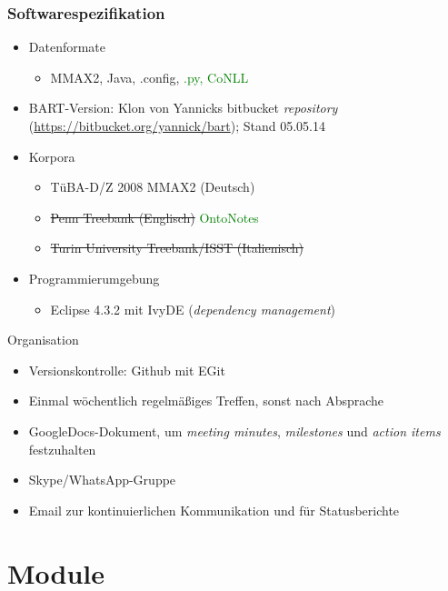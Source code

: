 \documentclass[11pt,a4paper]{beamer}
\begin{document}
\begin{frame}
\frametitle{Softwarespezifikation}

\begin{itemize}

	\item Datenformate
		\begin{itemize}
		\item MMAX2, Java, .config, \textcolor{green}{.py, CoNLL}
	\end{itemize}
	\item BART-Version: Klon von Yannicks bitbucket \textit{repository} (\url{https://bitbucket.org/yannick/bart}); Stand 05.05.14 
	\item Korpora
	\begin{itemize}
		\item TüBA-D/Z 2008 MMAX2 (Deutsch)
		\item \sout{Penn Treebank (Englisch)} \textcolor{green}{OntoNotes}
		\item \sout{Turin University Treebank/ISST (Italienisch)}
	\end{itemize}
	\item Programmierumgebung
	\begin{itemize}
		\item Eclipse 4.3.2 mit IvyDE (\textit{dependency management})
	\end{itemize}

\end{itemize}
\end{frame}

\begin{frame}{Organisation} 
	\begin{itemize}
	\item Versionskontrolle: Github mit EGit
	\item Einmal wöchentlich regelmäßiges Treffen, sonst nach Absprache
	\item GoogleDocs-Dokument, um \textit{meeting minutes}, \textit{milestones}  und \textit{action items} festzuhalten
	\item Skype/WhatsApp-Gruppe
	\item Email zur kontinuierlichen Kommunikation und für Statusberichte
	
	\end{itemize}
\end{frame}
\section{Module}
\end{document}

